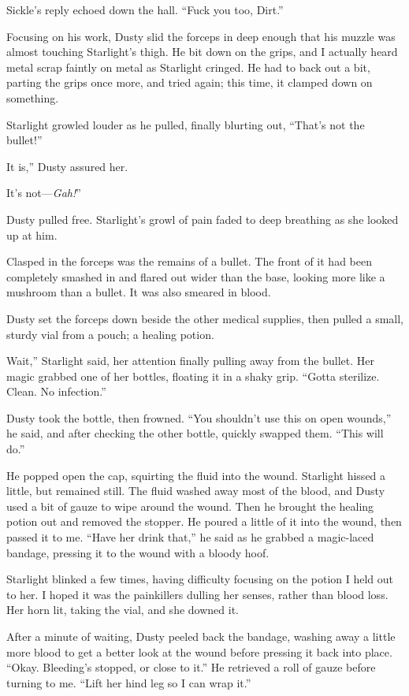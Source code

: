Sickle’s reply echoed down the hall. “Fuck you too, Dirt.”

Focusing on his work, Dusty slid the forceps in deep enough that his muzzle was almost touching Starlight’s thigh. He bit down on the grips, and I actually heard metal scrap faintly on metal as Starlight cringed. He had to back out a bit, parting the grips once more, and tried again; this time, it clamped down on something.

Starlight growled louder as he pulled, finally blurting out, “That’s not the bullet!”

\leavevmode{}It is,” Dusty assured her.

\leavevmode{}It’s not—\textit{Gah!}”

Dusty pulled free. Starlight’s growl of pain faded to deep breathing as she looked up at him.

Clasped in the forceps was the remains of a bullet. The front of it had been completely smashed in and flared out wider than the base, looking more like a mushroom than a bullet. It was also smeared in blood.

Dusty set the forceps down beside the other medical supplies, then pulled a small, sturdy vial from a pouch; a healing potion.

\leavevmode{}Wait,” Starlight said, her attention finally pulling away from the bullet. Her magic grabbed one of her bottles, floating it in a shaky grip. “Gotta sterilize. Clean. No infection.”

Dusty took the bottle, then frowned. “You shouldn’t use this on open wounds,” he said, and after checking the other bottle, quickly swapped them. “This will do.”

He popped open the cap, squirting the fluid into the wound. Starlight hissed a little, but remained still. The fluid washed away most of the blood, and Dusty used a bit of gauze to wipe around the wound. Then he brought the healing potion out and removed the stopper. He poured a little of it into the wound, then passed it to me. “Have her drink that,” he said as he grabbed a magic-laced bandage, pressing it to the wound with a bloody hoof.

Starlight blinked a few times, having difficulty focusing on the potion I held out to her. I hoped it was the painkillers dulling her senses, rather than blood loss. Her horn lit, taking the vial, and she downed it.

After a minute of waiting, Dusty peeled back the bandage, washing away a little more blood to get a better look at the wound before pressing it back into place. “Okay. Bleeding’s stopped, or close to it.” He retrieved a roll of gauze before turning to me. “Lift her hind leg so I can wrap it.”

